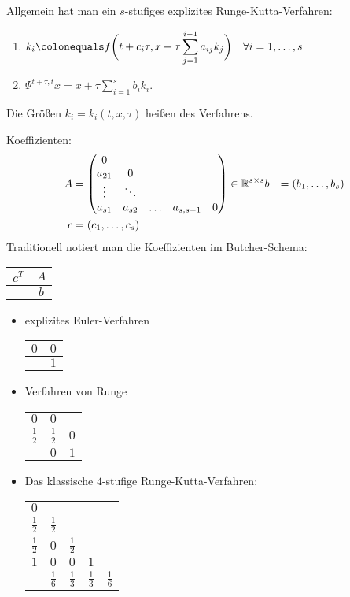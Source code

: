Allgemein hat man ein $s$-stufiges explizites Runge-Kutta-Verfahren:
\begin{enumerate}
	\item $\displaystyle k_i\colonequals f \bigg(t+c_i \tau,x+\tau \sum_{j=1}^{i-1} a_{ij}k_j \bigg)
	\quad \forall i=1,\ldots,s$
	\item $\displaystyle \Psi^{t+\tau,t} x=x+\tau \sum_{i=1}^s b_ik_i$.
\end{enumerate}

Die Größen $k_i=k_i (t,x,\tau )$ heißen  des Verfahrens.

Koeffizienten: 
\begin{align*}
	A & = 
	\begin{pmatrix}
	0 \\
	a_{21} & 0 \\
	\vdots & \ddots \\
	a_{s1} & a_{s2} & \ldots & a_{s,s-1} & 0
	\end{pmatrix} \in \mathbb R^{s \times s}
	b & = (b_1,\ldots,b_s) \\
	c & = (c_1,\ldots,c_s) \\
\end{align*}
Traditionell notiert man die Koeffizienten im Butcher-Schema:
\begin{center}
	\begin{tabular}{c|c}
		$c^T$ & $A$ \\ \hline
		& $b$
	\end{tabular}
\end{center}

\begin{bsp}
	\begin{itemize}[leftmargin=*]
		\item explizites Euler-Verfahren 
		\begin{tabular}{c|c}
			$0$ & $0$ \\ \hline
			& $1$
		\end{tabular}
		
		\item Verfahren von Runge 
		\begin{tabular}{c|cc}
			$0$ & $0$ &  \\
			$\frac{1}{2}$ & $\frac{1}{2}$ & $0$ \\ \hline
			& $0$ & $1$
		\end{tabular}
		\item Das klassische $4$-stufige Runge-Kutta-Verfahren:
		\begin{center}
			\begin{tabular}{c|cccc}
				$0$ &  &  &  &  \\
				$\frac{1}{2}$ & $\frac{1}{2}$ &  &  &  \\
				$\frac{1}{2}$ & $0$ & $\frac{1}{2}$ &  &  \\
				$1$ & $0$ & $0$ & $1$ &  \\
			\hline
			 & $\frac{1}{6}$ & $\frac{1}{3}$ & $\frac{1}{3}$ & $\frac{1}{6}$ \\
			\end{tabular}
		\end{center}
	\end{itemize}
\end{bsp}

